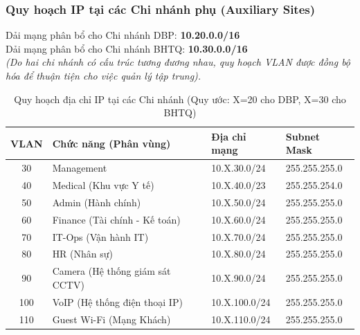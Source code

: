 \subsubsection{Quy hoạch IP tại các Chi nhánh phụ (Auxiliary Sites)}
Dải mạng phân bổ cho Chi nhánh DBP: \textbf{10.20.0.0/16} \\
Dải mạng phân bổ cho Chi nhánh BHTQ: \textbf{10.30.0.0/16} \\
\textit{(Do hai chi nhánh có cấu trúc tương đương nhau, quy hoạch VLAN được đồng bộ hóa để thuận tiện cho việc quản lý tập trung).}

{
    \small
    \renewcommand{\arraystretch}{1.3}
    \begin{longtable}{|c|>{\raggedright\arraybackslash}p{6cm}|l|l|}
        \caption{Quy hoạch địa chỉ IP tại các Chi nhánh (Quy ước: X=20 cho DBP, X=30 cho BHTQ)}
        \label{tab:ip_aux} \\
        \hline
        \textbf{VLAN} & \textbf{Chức năng (Phân vùng)} & \textbf{Địa chỉ mạng} & \textbf{Subnet Mask} \\
        \hline
        \endfirsthead
        
        \endhead

        \endfoot

        \hline
        \endlastfoot

        30 & Management & 10.X.30.0/24 & 255.255.255.0 \\
        \hline
        40 & Medical (Khu vực Y tế) & 10.X.40.0/23 & 255.255.254.0 \\
        \hline
        50 & Admin (Hành chính) & 10.X.50.0/24 & 255.255.255.0 \\
        \hline
        60 & Finance (Tài chính - Kế toán) & 10.X.60.0/24 & 255.255.255.0 \\
        \hline
        70 & IT-Ops (Vận hành IT) & 10.X.70.0/24 & 255.255.255.0 \\
        \hline
        80 & HR (Nhân sự) & 10.X.80.0/24 & 255.255.255.0 \\
        \hline
        90 & Camera (Hệ thống giám sát CCTV) & 10.X.90.0/24 & 255.255.255.0 \\
        \hline
        100 & VoIP (Hệ thống điện thoại IP) & 10.X.100.0/24 & 255.255.255.0 \\
        \hline
        110 & Guest Wi-Fi (Mạng Khách) & 10.X.110.0/24 & 255.255.255.0 \\
    \end{longtable}
}



